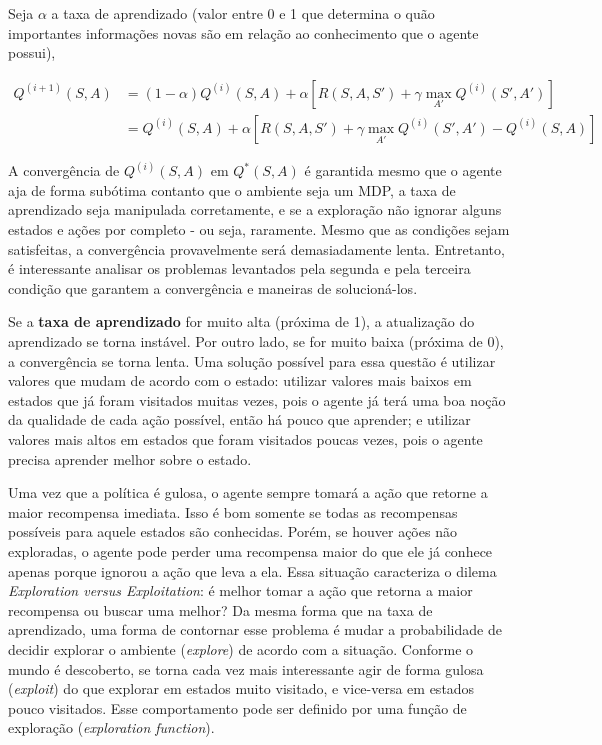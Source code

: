 Seja $\alpha$ a taxa de aprendizado (valor entre 0 e 1 que determina o quão importantes informações novas são em relação ao conhecimento que o agente possui),

\begin{equation} \label{eq:q_update}
\begin{align*}
Q^{(i+1)}(S,A) &= (1-\alpha)Q^{(i)}(S,A) + \alpha[R(S,A,S') + \gamma \max_{A'}Q^{(i)}(S',A')] \\
            &= Q^{(i)}(S,A) + \alpha[R(S,A,S') + \gamma \max_{A'}Q^{(i)}(S',A') - Q^{(i)}(S,A)]
\end{align*}
\end{equation}

A convergência de $Q^{(i)}(S,A)$ em $Q^{*}(S,A)$ é garantida mesmo que o agente aja de forma subótima contanto que o ambiente seja um MDP, a taxa de aprendizado seja manipulada corretamente, e se a exploração não ignorar alguns estados e ações por completo - ou seja, raramente. Mesmo que as condições sejam satisfeitas, a convergência provavelmente será demasiadamente lenta. Entretanto, é interessante analisar os problemas levantados pela segunda e pela terceira condição que garantem a convergência e maneiras de solucioná-los.

Se a \textbf{taxa de aprendizado} for muito alta (próxima de 1), a atualização do aprendizado se torna instável. Por outro lado, se for muito baixa (próxima de 0), a convergência se torna lenta. Uma solução possível para essa questão é utilizar valores que mudam de acordo com o estado: utilizar valores mais baixos em estados que já foram visitados muitas vezes, pois o agente já terá uma boa noção da qualidade de cada ação possível, então há pouco que aprender; e utilizar valores mais altos em estados que foram visitados poucas vezes, pois o agente precisa aprender melhor sobre o estado.

Uma vez que a política é gulosa, o agente sempre tomará a ação que retorne a maior recompensa imediata. Isso é bom somente se todas as recompensas possíveis para aquele estados são conhecidas. Porém, se houver ações não exploradas, o agente pode perder uma recompensa maior do que ele já conhece apenas porque ignorou a ação que leva a ela. Essa situação caracteriza o dilema \textit{Exploration versus Exploitation}: é melhor tomar a ação que retorna a maior recompensa ou buscar uma melhor? Da mesma forma que na taxa de aprendizado, uma forma de contornar esse problema é mudar a probabilidade de decidir explorar o ambiente (\textit{explore}) de acordo com a situação. Conforme o mundo é descoberto, se torna cada vez mais interessante agir de forma gulosa (\textit{exploit}) do que explorar em estados muito visitado, e vice-versa em estados pouco visitados. Esse comportamento pode ser definido por uma função de exploração (\textit{exploration function}).

